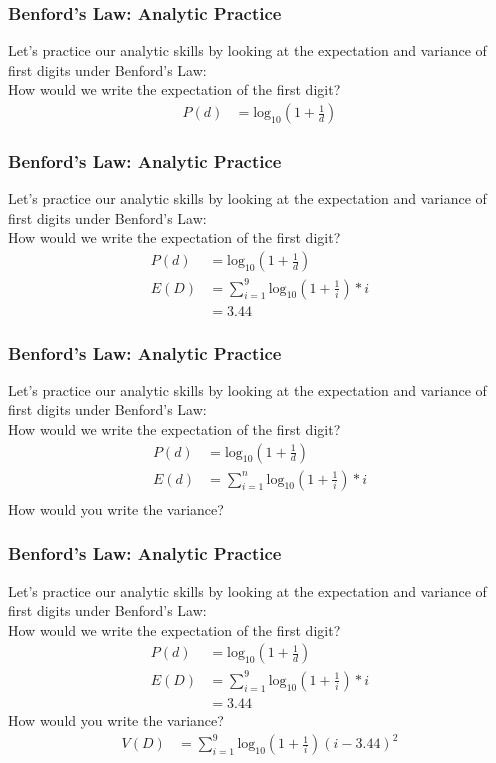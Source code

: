 \documentclass{beamer}
\begin{document}
\begin{frame}\frametitle{Benford's Law: Analytic Practice}
Let's practice our analytic skills by looking at the expectation and variance of first digits under Benford's Law: \\
How would we write the expectation of the first digit?
\begin{align*}
P(d) &= \text{log}_{10}(1 + \frac{1}{d})
\end{align*}
\end{frame}

\begin{frame}\frametitle{Benford's Law: Analytic Practice}
Let's practice our analytic skills by looking at the expectation and variance of first digits under Benford's Law: \\
How would we write the expectation of the first digit?
\begin{align*}
P(d) &= \text{log}_{10}(1 + \frac{1}{d}) \\
E(D) &= \sum_{i=1}^9 \text{log}_{10}(1 + \frac{1}{i})*i \\
&= 3.44 
\end{align*}
\end{frame}

\begin{frame}\frametitle{Benford's Law: Analytic Practice}
Let's practice our analytic skills by looking at the expectation and variance of first digits under Benford's Law: \\
How would we write the expectation of the first digit?
\begin{align*}
P(d) &= \text{log}_{10}(1 + \frac{1}{d}) \\
E(d) &= \sum_{i=1}^n \text{log}_{10}(1 + \frac{1}{i})*i \\
\end{align*}
How would you write the variance?
\end{frame}

\begin{frame}\frametitle{Benford's Law: Analytic Practice}
Let's practice our analytic skills by looking at the expectation and variance of first digits under Benford's Law: \\
How would we write the expectation of the first digit?
\begin{align*}
P(d) &= \text{log}_{10}(1 + \frac{1}{d}) \\
E(D) &= \sum_{i=1}^9 \text{log}_{10}(1 + \frac{1}{i})*i \\
&= 3.44 
\end{align*}
How would you write the variance?
\begin{align*}
V(D) &= \sum_{i=1}^9 \text{log}_{10}(1 + \frac{1}{i})(i - 3.44)^2  
\end{align*}
\end{frame}
\end{document}

